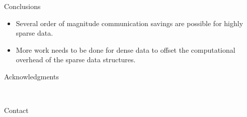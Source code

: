 \documentclass[final]{beamer}
\newlength{\onecolwid}
\begin{document}
\begin{frame}[t]
\begin{columns}[t]
\begin{column}{\onecolwid}
\begin{block}{Conclusions}
		\begin{itemize}
			\item Several order of magnitude communication savings
				are possible for highly sparse data.
			\item More work needs to be done for dense data to offset the computational
				overhead of the sparse data structures.
		\end{itemize}
		
	\end{block}
	
	
	
	
	
	
	\begin{block}{Acknowledgments}
	
	\small{} \\
	
	\end{block}
	
	
	

	
	\begin{alertblock}{Contact}
	

\end{alertblock}
\end{column}
\end{columns}
\end{frame}
\end{document}
